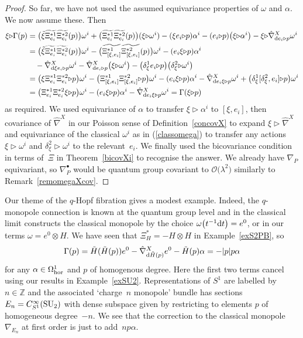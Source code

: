 \documentclass[pdftex]{sigma}
\numberwithin{equation}{section}
\newcommand{\Z}{{\mathbb{Z}}}
\newcommand{\<}{{\langle}}
\renewcommand{\>}{{\rangle}}
\newcommand{\tens}{\otimes}
\newcommand{\extd}{{\rm d}}
\newcommand{\la}{{\triangleright}}
\begin{document}
\begin{proof}
So far, we have not used the assumed equivariance properties of $\omega$ and $\alpha$. We now assume these. Then
\begin{align*}\xi\la\Gamma(p)&=\big(\tilde\xi\widetilde{\Xi^{*1}_{e_i}}\widetilde{\Xi^{*2}_{e_i}}(p)\big)\omega^i + \big(\widetilde{\Xi^{*1}_{e_i}}\widetilde{\Xi^{*2}_{e_i}}(p)\big)(\xi\la\omega^i) -(\xi e_i\la p)\alpha^i- (e_i\la p)\big(\xi\la\alpha^i\big)- \xi\la \hat\nabla^X_{\extd e_i\la p}\omega^i\\
&=\big(\tilde\xi\widetilde{\Xi^{*1}_{e_i}}\widetilde{\Xi^{*2}_{e_i}}(p)\big)\omega^i
 - \big(\widetilde{\Xi^{*1}_{[\xi,e_i]}}\widetilde{\Xi^{*2}_{[\xi,e_i]}}(p)\big)\omega^i-(e_i\xi\la p)\alpha^i\\
 &\quad{} -\hat\nabla^X_{\extd \xi e_i\la p}\omega^i -\hat\nabla^X_{\extd e_i\la p}\big(\xi\la \omega^i\big)-\big( \delta^1_\xi e_i\la p\big)\big(\delta^2_\xi\la \omega^i\big)\\
 &= \big(\xi\Xi^{*1}_{e_i}\Xi^{*2}_{e_i}\la p\big)\omega^i
 - \big(\Xi^{*1}_{[\xi,e_i]}\Xi^{*2}_{[\xi,e_i]}\la p\big)\omega^i-(e_i\xi\la p)\alpha^i-\hat\nabla^X_{\extd e_i\xi\la p}\omega^i+\big( \delta^1_\xi [\delta^2_\xi,e_i]\la p\big)\omega^i \\
 &= \big(\Xi^{*1}_{e_i}\Xi^{*2}_{e_i}\xi\la p\big)\omega^i-(e_i\xi\la p)\alpha^i-\hat\nabla^X_{\extd e_i\xi\la p}\omega^i=\Gamma(\xi\la p)
\end{align*}
as required. We used equivariance of $\alpha$ to transfer $\xi\la\alpha^i$ to $[\xi,e_i]$, then covariance of $\hat\nabla^X$ in our Poisson sense of Definition~\ref{concovX} to expand $\xi\la\hat\nabla^X$ and equivariance of the classical $\omega^i$ as in (\ref{classomega}) to transfer any actions $\xi\la\omega^i$ and $\delta^2_\xi\la\omega^i$ to the relevant~$e_i$. We finally used the bicovariance condition in terms of~$\Xi$ in Theorem~\ref{bicovXi} to recognise the answer. We already have $\nabla_P$ equivariant, so $\nabla_P^\bullet$ would be quantum group covariant to $\mathcal{O}\big(\lambda^2\big)$ similarly to Remark~\ref{remomegaXcov}.
 \end{proof}

 \begin{Example} Our theme of the $q$-Hopf fibration gives a modest example. Indeed, the $q$-monopole connection is known at the quantum group level \cite{BegMa, BrzMa} and in the classical limit constructs the classical monopole by the choice $\omega \big(t^{-1}\extd t \big)=e^0$, or in our terms $\omega=e^0\tens H$. We have seen that $\Xi_H^*=-H\tens H$ in Example~\ref{exS2PB}, so
 \[ \Gamma(p)=\tilde H(\tilde H(p)) e^0-\hat\nabla^X_{\extd\tilde H(p)}e^0-\tilde H(p)\alpha=-|p|p\alpha\]
 for any $\alpha\in \Omega^1_{\rm hor}$ and $p$ of homogenous degree. Here the first two terms cancel using our results in Example~\ref{exSU2}. Representations of $S^1$ are labelled by $n\in \Z$ and the associated `charge~$n$ monopole' bundle has sections $E_n=C^\infty_{S^1}({\rm SU}_2)$ with dense subspace given by restricting to elements $p$ of homogeneous degree~$-n$. We see that the correction to the classical monopole $\nabla_{E_n}$ at first order is just to add~$n p\alpha$.
 \end{Example}
\end{document}

